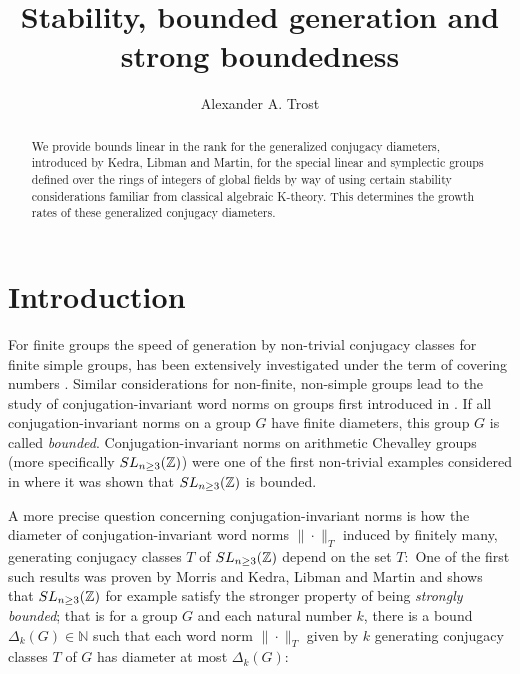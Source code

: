 \documentclass[12pt]{amsart}
\theoremstyle{definition}\newtheorem{definition}[theorem]{Definition}
\theoremstyle{remark}\newtheorem{remark}[theorem]{Remark}
\theoremstyle{definition}\newtheorem{case}{Case}
\begin{document}
\title{Stability, bounded generation and strong boundedness}

\author{Alexander A. Trost}
\address{Institute of Mathematics, University of Wroc{\l}aw, 50-383 Wroc{\l}aw, Poland}

\maketitle

\begin{abstract}
We provide bounds linear in the rank for the generalized conjugacy diameters, introduced by Kedra, Libman and Martin, for the special linear and symplectic groups defined over the rings of integers of global fields by way of using certain stability considerations familiar from classical algebraic K-theory. This determines the growth rates of these generalized conjugacy diameters.
\end{abstract}

\section{Introduction}

For finite groups the speed of generation by non-trivial conjugacy classes for finite simple groups, has been extensively investigated under the term of covering numbers \cite{MR783068,MR1865975}. Similar considerations for non-finite, non-simple groups lead to the study of conjugation-invariant word norms on groups first introduced in \cite{MR2509711}. If all conjugation-invariant norms on a group $G$ have finite diameters, this group $G$ is called \textit{bounded}. Conjugation-invariant norms on arithmetic Chevalley groups (more specifically ${\rm SL}_{n\geq 3}(\mathbb{Z})$) were one of the first non-trivial examples considered in \cite[Example~1.1]{MR2509711} where it was shown that ${\rm SL}_{n\geq 3}(\mathbb{Z})$ is bounded. 

A more precise question concerning conjugation-invariant norms is how the diameter of conjugation-invariant word norms $\|\cdot\|_T$ induced by finitely many, generating conjugacy classes $T$ of ${\rm SL}_{n\geq 3}(\mathbb{Z})$ depend on the set $T:$ One of the first such results was proven by Morris \cite{MR2357719} and Kedra, Libman and Martin \cite{KLM} and shows that ${\rm SL}_{n\geq 3}(\mathbb{Z})$ for example satisfy the stronger property of being \textit{strongly bounded}; that is for a group $G$ and each natural number $k$, there is a bound $\Delta_k(G)\in\mathbb{N}$ such that each word norm $\|\cdot\|_T$ given by $k$ generating conjugacy classes $T$ of $G$ has diameter at most $\Delta_k(G)$: %
\end{document}
